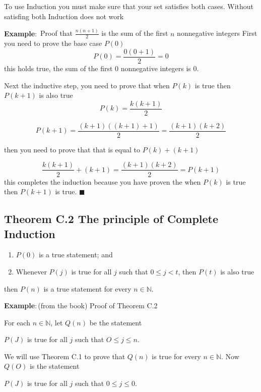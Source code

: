 \documentclass{article}
\begin{document}
To use Induction you must make sure that your set satisfies both cases. Without satisfing both Induction does not work

\textbf{Example$\colon$} Proof that $\frac{n(n+1)}{2}$ is the sum of the first $n$ nonnegative integers
First you need to prove the base case $P(0)$
\begin{equation}
    P(0) = \frac{0(0+1)}{2} = 0
\end{equation}
this holds true, the sum of the first 0 nonnegative integers is 0.

Next the inductive step, you need to prove that when $P(k)$ is true then $P(k+1)$ is also true
\begin{equation}
    P(k) = \frac{k(k+1)}{2}
\end{equation}

\begin{equation}
    P(k+1) = \frac{(k+1)((k+1)+1)}{2} = \frac{(k+1)(k+2)}{2}
\end{equation}

then you need to prove that that is equal to $P(k) + (k+1)$

\begin{equation}
    \frac{k(k+1)}{2} + (k+1) = \frac{(k+1)(k+2)}{2} = P(k+1)
\end{equation}
this completes the induction because you have proven the when $P(k)$ is true then $P(k+1)$ is true. $\blacksquare$

\subsection*{Theorem C.2 The principle of Complete Induction}

\begin{enumerate}
    \item $P(0)$ is a true statement; and
    \item Whenever $P(j)$ is true for all $j$ such that $0 \leq j < t$, then $P(t)$ is also true
\end{enumerate}
then $P(n)$ is a true statement for every $n \in \mathbb{N}$.

\textbf{Example$\colon$}(from the book) Proof of Theorem C.2

For each $n \in \mathbb{N}$, let $Q(n)$ be the statement
\begin{center}
$P(J)$ is true for all $j$ such that $O \leq j \leq n$.
\end{center}
We will use Theorem C.1 to prove that $Q(n)$ is true for every $n \in \mathbb{N}$.
Now $Q(O)$ is the statement
\begin{center}
    $P(J)$ is true for all $j$ such that $0 \leq j \leq 0$. 
\end{center}
\end{document}
